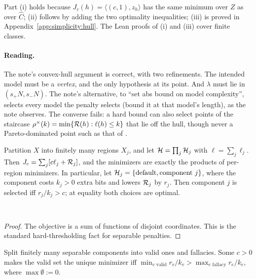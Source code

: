 Part (i) holds because $J_c(h)=\langle(c,1),z_h\rangle$ has the same minimum over $Z$ as over $\hat C$; (ii) follows by adding the two optimality inequalities; (iii) is proved in Appendix~\ref{app:simplicity:hull}. The Lean proofs of (i) and (iii) cover finite classes.

\paragraph{Reading.} The note's convex-hull argument is correct, with two refinements. The intended model must be a \emph{vertex}, and the only hypothesis at its point. And $\lambda$ must lie in $(s_+N,s_-N)$. The note's alternative, to ``set abs bound on model complexity'', selects every model the penalty selects (bound it at that model's length), as the note observes. The converse fails: a hard bound can also select points of the staircase $\rho^\times(k)=\min\{\mathcal R(h):\ell(h)\le k\}$ that lie off the hull, though never a Pareto-dominated point such as that of .

\begin{theorem}\label{thm:simplicity:separable}
Partition $X$ into finitely many regions $X_j$, and let $\mathcal{H}=\prod_j\mathcal{H}_j$ with $\ell=\sum_j\ell_j$. Then $J_c=\sum_j[c\ell_j+\mathcal R_j]$, and the minimizers are exactly the products of per-region minimizers. In particular, let $\mathcal{H}_j=\{\text{default},\text{component }j\}$, where the component costs $k_j>0$ extra bits and lowers $\mathcal R_j$ by $r_j$. Then component $j$ is selected iff $r_j/k_j>c$; at equality both choices are optimal.

\hfill{}\ 
\end{theorem}

\begin{proof}
The objective is a sum of functions of disjoint coordinates. This is the standard hard-thresholding fact for separable penalties.
\end{proof}

\begin{corollary}\label{cor:simplicity:selectable}
Split finitely many separable components into valid ones and fallacies. Some $c>0$ makes the valid set the unique minimizer iff $\min_{v\text{ valid}}r_v/k_v>\max_{e\text{ fallacy}}r_e/k_e$, where $\max\emptyset:=0$.

\hfill{}
\end{corollary}

